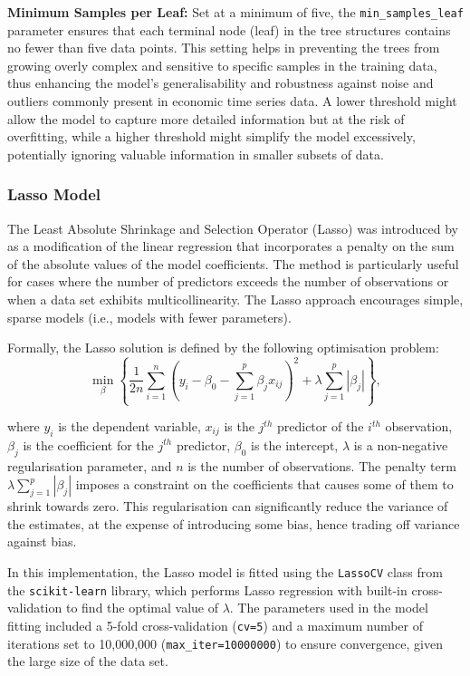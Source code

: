 \noindent \textbf{Minimum Samples per Leaf:} Set at a minimum of five, the \texttt{min\_samples\_leaf} parameter ensures that each terminal node (leaf) in the tree structures contains no fewer than five data points. This setting helps in preventing the trees from growing overly complex and sensitive to specific samples in the training data, thus enhancing the model's generalisability and robustness against noise and outliers commonly present in economic time series data. A lower threshold might allow the model to capture more detailed information but at the risk of overfitting, while a higher threshold might simplify the model excessively, potentially ignoring valuable information in smaller subsets of data.

\subsubsection{Lasso Model}

The Least Absolute Shrinkage and Selection Operator (Lasso) was introduced by \textcite{Tibshirani1996RegressionLasso} as a modification of the linear regression that incorporates a penalty on the sum of the absolute values of the model coefficients. The method is particularly useful for cases where the number of predictors exceeds the number of observations or when a data set exhibits multicollinearity. The Lasso approach encourages simple, sparse models (i.e., models with fewer parameters).

Formally, the Lasso solution is defined by the following optimisation problem:
\begin{equation}
    \min_{\beta} \left\{ \frac{1}{2n} \sum_{i=1}^n \left( y_i - \beta_0 - \sum_{j=1}^p \beta_j x_{ij} \right)^2 + \lambda \sum_{j=1}^p |\beta_j| \right\},
\end{equation}

where $y_i$ is the dependent variable, $x_{ij}$ is the $j^{th}$ predictor of the $i^{th}$ observation, $\beta_j$ is the coefficient for the $j^{th}$ predictor, $\beta_0$ is the intercept, $\lambda$ is a non-negative regularisation parameter, and $n$ is the number of observations. The penalty term $\lambda \sum_{j=1}^p |\beta_j|$ imposes a constraint on the coefficients that causes some of them to shrink towards zero. This regularisation can significantly reduce the variance of the estimates, at the expense of introducing some bias, hence trading off variance against bias.

In this implementation, the Lasso model is fitted using the \texttt{LassoCV} class from the \texttt{scikit-learn} library, which performs Lasso regression with built-in cross-validation to find the optimal value of $\lambda$. The parameters used in the model fitting included a 5-fold cross-validation (\texttt{cv=5}) and a maximum number of iterations set to 10,000,000 (\texttt{max\_iter=10000000}) to ensure convergence, given the large size of the data set.

